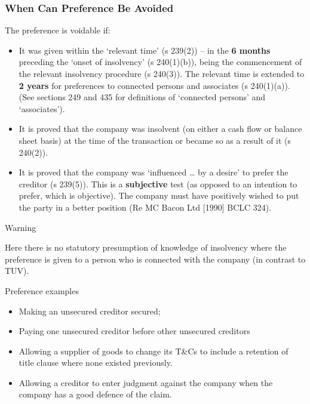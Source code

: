 \documentclass[
]{article}
\providecommand{\tightlist}{%
  \setlength{\itemsep}{0pt}\setlength{\parskip}{0pt}}
\newenvironment{env-c2ea7781-55a7-40ef-9219-ca9616c6b82e}
{
    \savenotes\tcolorbox[blanker,breakable,left=5pt,borderline west={2pt}{-4pt}{orange}]
}
{
    \endtcolorbox\spewnotes
}
\newenvironment{env-0a540a95-48c3-4466-84d1-6ddd726278e0}
{
    \savenotes\tcolorbox[blanker,breakable,left=5pt,borderline west={2pt}{-4pt}{purple}]
}
{
    \endtcolorbox\spewnotes
}
\begin{document}
\hypertarget{when-can-preference-be-avoided}{%
\subsubsection{When Can Preference Be
Avoided}\label{when-can-preference-be-avoided}}

The preference is voidable if:

\begin{itemize}
\tightlist
\item
  It was given within the `relevant time' (s 239(2)) -- in the \textbf{6
  months} preceding the `onset of insolvency' (s 240(1)(b)), being the
  commencement of the relevant insolvency procedure (s 240(3)). The
  relevant time is extended to \textbf{2 years} for preferences to
  connected persons and associates (s 240(1)(a)). (See sections 249 and
  435 for definitions of `connected persons' and `associates').
\item
  It is proved that the company was insolvent (on either a cash flow or
  balance sheet basis) at the time of the transaction or became so as a
  result of it (s 240(2)).
\item
  It is proved that the company was `influenced \ldots{} by a desire' to
  prefer the creditor (s 239(5)). This is a \textbf{subjective} test (as
  opposed to an intention to prefer, which is objective). The company
  must have positively wished to put the party in a better position (Re
  MC Bacon Ltd {[}1990{]} BCLC 324).
\end{itemize}

\begin{env-c2ea7781-55a7-40ef-9219-ca9616c6b82e}

Warning

Here there is no statutory presumption of knowledge of insolvency where
the preference is given to a person who is connected with the company
(in contrast to TUV).

\end{env-c2ea7781-55a7-40ef-9219-ca9616c6b82e}

\begin{env-0a540a95-48c3-4466-84d1-6ddd726278e0}

Preference examples

\begin{itemize}
\tightlist
\item
  Making an unsecured creditor secured;
\item
  Paying one unsecured creditor before other unsecured creditors
\item
  Allowing a supplier of goods to change its T\&Cs to include a
  retention of title clause where none existed previously.
\item
  Allowing a creditor to enter judgment against the company when the
  company has a good defence of the claim.
\end{itemize}

\end{env-0a540a95-48c3-4466-84d1-6ddd726278e0}
\end{document}
